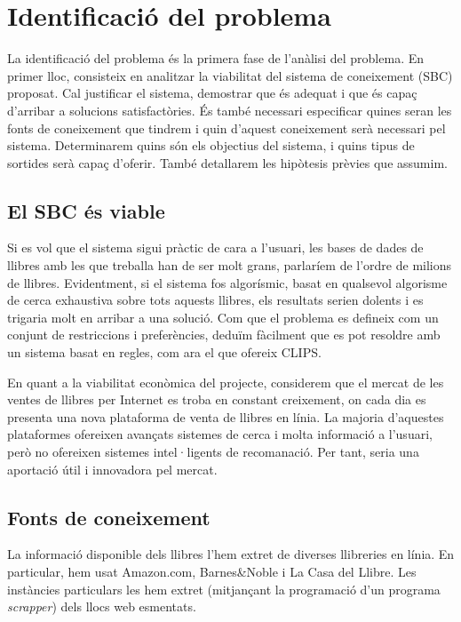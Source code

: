 
\section{Identificació del problema}

La identificació del problema és la primera fase de l'anàlisi del problema. En primer lloc, consisteix en analitzar la viabilitat del sistema de coneixement (SBC) proposat. Cal justificar el sistema, demostrar que és adequat i que és capaç d'arribar a solucions satisfactòries. És també necessari especificar quines seran les fonts de coneixement que tindrem i quin d'aquest coneixement serà necessari pel sistema. Determinarem quins són els objectius del sistema, i quins tipus de sortides serà capaç d'oferir. També detallarem les hipòtesis prèvies que assumim.

\subsection{El SBC és viable}

Si es vol que el sistema sigui pràctic de cara a l'usuari, les bases de dades de llibres amb les que treballa han de ser molt grans, parlaríem de l'ordre de milions de llibres. Evidentment, si el sistema fos algorísmic, basat en qualsevol algorisme de cerca exhaustiva sobre tots aquests llibres, els resultats serien dolents i es trigaria molt en arribar a una solució. Com que el problema es defineix com un conjunt de restriccions i preferències, deduïm fàcilment que es pot resoldre amb un sistema basat en regles, com ara el que ofereix CLIPS.

En quant a la viabilitat econòmica del projecte, considerem que el mercat de les ventes de llibres per Internet es troba en constant creixement, on cada dia es presenta una nova plataforma de venta de llibres en línia. La majoria d'aquestes plataformes ofereixen avançats sistemes de cerca i molta informació a l'usuari, però no ofereixen sistemes intel·ligents de recomanació. Per tant, seria una aportació útil i innovadora pel mercat.

\subsection{Fonts de coneixement}

La informació disponible dels llibres l'hem extret de diverses llibreries en línia. En particular, hem usat Amazon.com, Barnes\&Noble i La Casa del Llibre. Les instàncies particulars les hem extret (mitjançant la programació d'un programa \emph{scrapper}) dels llocs web esmentats.

